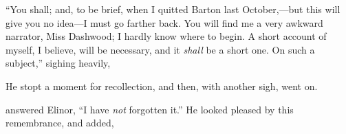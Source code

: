 “You shall; and, to be brief, when I quitted Barton last October,---but this will give you no idea---I must go farther back. You will find me a very awkward narrator, Miss Dashwood; I hardly know where to begin. A short account of myself, I believe, will be necessary, and it {\em shall} be a short one. On such a subject,” sighing heavily, 

He stopt a moment for recollection, and then, with another sigh, went on.


 answered Elinor, “I have {\em not} forgotten it.” He looked pleased by this remembrance, and added,

